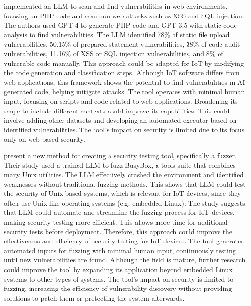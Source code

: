 \smallskip
\noindent \textbf{\citet{tóth2024llms}} implemented an LLM to scan and find vulnerabilities in web environments, focusing on PHP code and common web attacks such as XSS and SQL injection.
The authors used GPT-4 to generate PHP code and GPT-3.5 with static code analysis to find vulnerabilities.
The LLM identified 78\% of static file upload vulnerabilities, 50.15\% of prepared statement vulnerabilities, 38\% of code audit vulnerabilities, 11.16\% of XSS or SQL injection vulnerabilities, and 8\% of vulnerable code manually.
This approach could be adapted for IoT by modifying the code generation and classification steps.
Although IoT software differs from web applications, this framework shows the potential to find vulnerabilities in AI-generated code, helping mitigate attacks.
The tool operates with minimal human input, focusing on scripts and code related to web applications.
Broadening its scope to include different contexts could improve its capabilities.
This could involve adding other datasets and developing an automated executor based on identified vulnerabilities.
The tool's impact on security is limited due to its focus only on web-based security.

\smallskip
\noindent \textbf{\citet{oliinyk2024fuzzing}} present a new method for creating a security testing tool, specifically a fuzzer.
Their study used a trained LLM to fuzz BusyBox, a tools suite that combines many Unix utilities.
The LLM effectively crashed the environment and identified weaknesses without traditional fuzzing methods.
This shows that LLM could test the security of Unix-based systems, which is relevant for IoT devices, since they often use Unix-like operating systems (e.g. embedded Linux).
The study suggests that LLM could automate and streamline the fuzzing process for IoT devices, making security testing more efficient.
This allows more time for additional security tests before deployment.
Therefore, this approach could improve the effectiveness and efficiency of security testing for IoT devices.
The tool generates automated inputs for fuzzing with minimal human input, continuously testing until new vulnerabilities are found.
Although the field is mature, further research could improve the tool by expanding its application beyond embedded Linux systems to other types of systems.
The tool's impact on security is limited to fuzzing, increasing the efficiency of vulnerability discovery without providing solutions to patch them or protecting the system afterwards.


